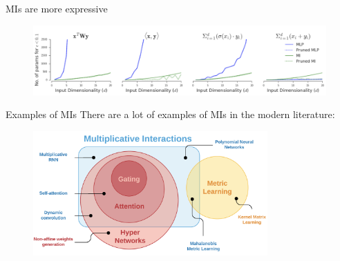 \documentclass[10pt]{beamer}
\begin{document}
\begin{frame}{MIs are more expressive}
    \begin{figure}
        \centering
        \includegraphics[width=\textwidth]{images/MIs_are_more_expressive.png}
    \end{figure}
\end{frame}

\begin{frame}{Examples of MIs}
    There are a lot of examples of MIs in the modern literature:
    \begin{figure}
        \centering
        \includegraphics[width=0.8\textwidth]{images/mi_venn_diag.png}
    \end{figure}
\end{frame}
\end{document}
